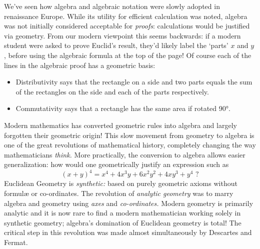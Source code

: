We've seen how algebra and algebraic notation were slowly adopted in renaissance Europe. While its utility for efficient calculation was noted, algebra was not initially considered acceptable for \emph{proofs}: calculations would be justified via geometry. From our modern viewpoint this seems backwards: if a modern student were asked to prove Euclid's result, they'd likely label the `parts' $x$ and $y$, before using the algebraic formula at the top of the page! Of course each of the lines in the algebraic proof has a geometric basis:
\begin{itemize}
  \item Distributivity says that the rectangle on a side and two parts equals the sum of the rectangles on the side and each of the parts respectively.
  \item Commutativity says that a rectangle has the same area if rotated \ang{90}.
\end{itemize}
Modern mathematics has converted geometric rules into algebra and largely forgotten their geometric origin! This slow movement from geometry to algebra is one of the great revolutions of mathematical history, completely changing the way mathematicians \emph{think.} More practically, the conversion to algebra allows easier generalization: how would one geometrically justify an expression such as
\[(x+y)^4=x^4+4x^3y+6x^2y^2+4xy^3+y^4\text{ ?}\]
Euclidean Geometry is \emph{synthetic:} based on purely geometric axioms without formulæ or co-ordinates. The revolution of \emph{analytic geometry} was to marry algebra and geometry using \emph{axes} and \emph{co-ordinates.} Modern geometry is primarily analytic and it is now rare to find a modern mathematician working solely in synthetic geometry; algebra's domination of Euclidean geometry is total! The critical step in this revolution was made almost simultaneously by Descartes and Fermat.
\goodbreak

